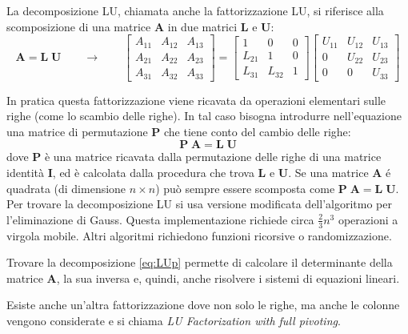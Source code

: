 \documentclass[10pt]{article}
\begin{document}
La decomposizione LU, chiamata anche la fattorizzazione LU, si riferisce alla scomposizione di una matrice $\mathbf{A}$ in due matrici $\mathbf{L}$ e $\mathbf{U}$:
\begin{equation}
\mathbf{A} = \mathbf{L} \; \mathbf{U}
\qquad \rightarrow \qquad
\begin{bmatrix}
A_{11} & A_{12} & A_{13} \\
A_{21} & A_{22} & A_{23} \\
A_{31} & A_{32} & A_{33}
\end{bmatrix} = 
\begin{bmatrix}
1 & 0 & 0 \\
L_{21} & 1 & 0 \\
L_{31} & L_{32} & 1
\end{bmatrix}
\begin{bmatrix}
U_{11} & U_{12} & U_{13} \\
0      & U_{22} & U_{23} \\
0      & 0      & U_{33}
\end{bmatrix}
\end{equation}

In pratica questa fattorizzazione viene ricavata da operazioni elementari sulle righe (come lo scambio delle righe). In tal caso bisogna introdurre nell'equazione una matrice di permutazione $\mathbf{P}$ che tiene conto del cambio delle righe:
\begin{equation}
\mathbf{P} \; \mathbf{A} = \mathbf{L} \; \mathbf{U}
\label{eq:LUp}
\end{equation}
dove $\mathbf{P}$ è una matrice ricavata dalla permutazione delle righe di una matrice identità $\mathbf{I}$, ed è calcolata dalla procedura che trova $\mathbf{L}$ e $\mathbf{U}$.
Se una matrice $\mathbf{A}$ é quadrata (di dimensione $n\times n$) può sempre essere scomposta come $\mathbf{P} \; \mathbf{A} = \mathbf{L} \; \mathbf{U}$.
Per trovare la decomposizione LU si usa versione modificata dell'algoritmo per l'eliminazione di Gauss. Questa implementazione richiede circa $\frac{2}{3}n^3$ operazioni a virgola mobile. Altri algoritmi richiedono funzioni ricorsive o randomizzazione.

Trovare la decomposizione \eqref{eq:LUp} permette di calcolare il determinante della matrice $\mathbf{A}$, la sua inversa e, quindi, anche risolvere i sistemi di equazioni lineari.

Esiste anche un'altra fattorizzazione dove non solo le righe, ma anche le colonne vengono considerate e si chiama \emph{LU Factorization with full pivoting}.
\end{document}
